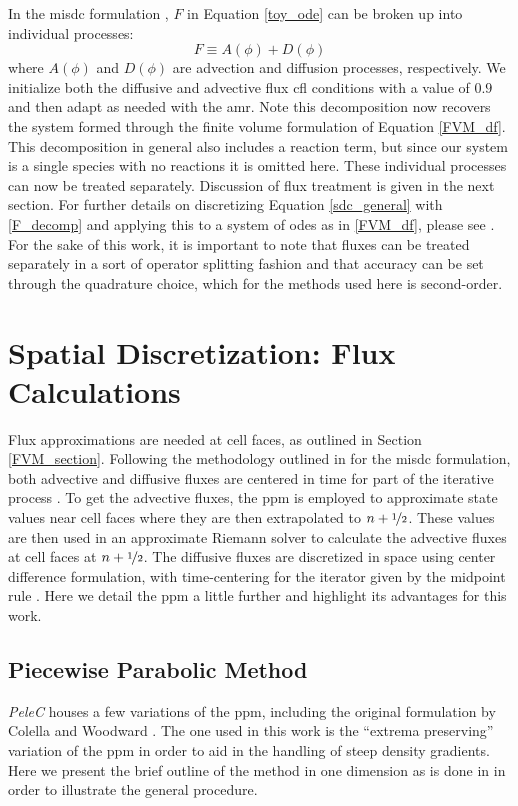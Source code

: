 In the \gls{misdc} formulation \cite{MISDC_general}, $F$ in Equation \eqref{toy_ode} can be broken up into individual processes: 
\begin{equation} \label{F_decomp}
F \equiv A(\phi) + D(\phi)
\end{equation}
where $A(\phi)$ and $D(\phi)$ are advection and diffusion processes, respectively. We initialize both the diffusive and advective flux \gls{cfl} conditions with a value of $0.9$ and then adapt as needed with the \gls{amr}. Note this decomposition now recovers the system formed through the finite volume formulation of Equation \eqref{FVM_df}. This decomposition in general also includes a reaction term, but since our system is a single species with no reactions it is omitted here. These individual processes can now be treated separately. Discussion of flux treatment is given in the next section. For further details on discretizing Equation \eqref{sdc_general} with \eqref{F_decomp} and applying this to a system of \gls{ode}s as in \eqref{FVM_df}, please see \cite{SDC_PeleC}. For the sake of this work, it is important to note that fluxes can be treated separately in a sort of operator splitting fashion and that accuracy can be set through the quadrature choice, which for the methods used here is second-order. 


\section{Spatial Discretization: Flux Calculations}
Flux approximations are needed at cell faces, as outlined in Section \ref{FVM_section}. Following the methodology outlined in for the \gls{misdc} formulation, both advective and diffusive fluxes are centered in time for part of the iterative process \cite{MISDC_general}. To get the advective fluxes, the \gls{ppm} \cite{1984JCoPPPM} is employed to approximate state values near cell faces where they are then extrapolated to $n+\nicefrac{1}{2}$. These values are then used in an approximate Riemann solver \cite{COLELLA1985264} to calculate the advective fluxes at cell faces at $n+\nicefrac{1}{2}$. The diffusive fluxes are discretized in space using center difference formulation, with time-centering for the iterator given by the midpoint rule \cite{COLELLA20087069, MILLER200226}. Here we detail the \gls{ppm} a little further and highlight its advantages for this work.
\subsection{Piecewise Parabolic Method}
\textit{PeleC} houses a few variations of the \gls{ppm}, including the original formulation by Colella and Woodward \cite{1984JCoPPPM}. The one used in this work is the ``extrema preserving'' variation of the \gls{ppm} \cite{COLELLA20087069, MILLER200226} in order to aid in the handling of steep density gradients. Here we present the brief outline of the method in one dimension as is done in \cite{PPM_WENO} in order to illustrate the general procedure. 

